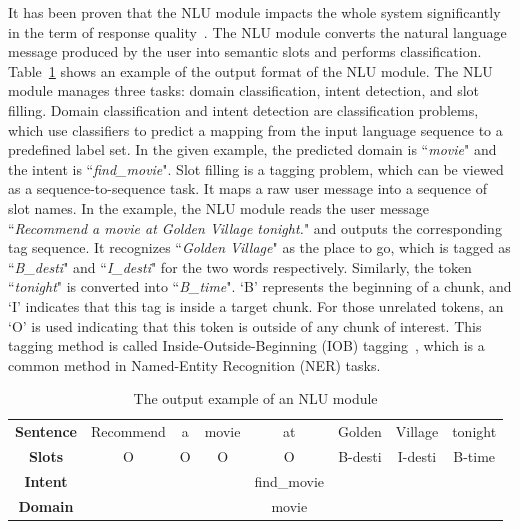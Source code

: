 \label{Natural Language Understanding}
It has been proven that the NLU module impacts the whole system significantly in the term of response quality~. The NLU module converts the natural language message produced by the user into semantic slots and performs classification. Table~\ref{The output example of an NLU module} shows an example of the output format of the NLU module. The NLU module manages three tasks: domain classification, intent detection, and slot filling. Domain classification and intent detection are classification problems, which use classifiers to predict a mapping from the input language sequence to a predefined label set. In the given example, the predicted domain is ``\textit{movie}" and the intent is ``\textit{find\_movie}". Slot filling is a tagging problem, which can be viewed as a sequence-to-sequence task. It maps a raw user message into a sequence of slot names. In the example, the NLU module reads the user message ``\textit{Recommend a movie at Golden Village tonight.}" and outputs the corresponding tag sequence. It recognizes ``\textit{Golden Village}" as the place to go, which is tagged as ``\textit{B\_desti}" and ``\textit{I\_desti}" for the two words respectively. Similarly, the token ``\textit{tonight}" is converted into ``\textit{B\_time}". `B' represents the beginning of a chunk, and `I' indicates that this tag is inside a target chunk. For those unrelated tokens, an `O' is used indicating that this token is outside of any chunk of interest. This tagging method is called Inside-Outside-Beginning (IOB) tagging~, which is a common method in Named-Entity Recognition (NER) tasks. 
\begin{table}
\caption{The output example of an NLU module}
\label{The output example of an NLU module} 
\centering
\begin{tabular}{|c|ccccccc|}
\hline
\textbf{Sentence} & \cellcolor{grey5}Recommend & \cellcolor{grey5}a & \cellcolor{grey5}movie & \cellcolor{grey5}at & \cellcolor{blue4}Golden & \cellcolor{blue4}Village & \cellcolor{orange4}tonight \\\cline{1-1}
\textbf{Slots} & \cellcolor{grey5}O & \cellcolor{grey5}O & \cellcolor{grey5}O & \cellcolor{grey5}O & \cellcolor{blue4}B-desti & \cellcolor{blue4}I-desti & \cellcolor{orange4}B-time\\\hline
\textbf{Intent} & & & & find\_movie & & & \\\hline
\textbf{Domain} & & & & movie & & & \\\hline
\end{tabular}
\end{table}
